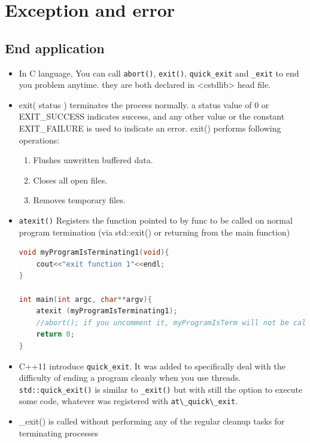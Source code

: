 \documentclass[a4paper,11pt,twoside]{book}
\begin{document}
\chapter{Exception and error}

\section{End application}
\begin{itemize}
	\item In C language, You can call \texttt{abort()}, \texttt{exit()}, \texttt{quick\_exit} and  \texttt{\_exit} to end you problem anytime. they are both declared in <cstdlib> head file.
	
	\item exit( status ) terminates the process normally.
	a status value of 0 or EXIT\_SUCCESS indicates success, and any other value or the constant EXIT\_FAILURE is used to indicate an error. exit() performs following operations:
	\begin{enumerate}
		\item Flushes unwritten buffered data.
		\item Closes all open files.
		\item Removes temporary files.
	\end{enumerate}
	
	\item \texttt{atexit()} Registers the function pointed to by func to be called on normal program termination (via std::exit() or returning from the main function)
\begin{lstlisting}[frame=single, language=c++]
void myProgramIsTerminating1(void){
	cout<<"exit function 1"<<endl;
}
	
int main(int argc, char**argv){
	atexit (myProgramIsTerminating1);
	//abort(); if you uncomment it, myProgramIsTerm will not be called.
	return 0;
}
\end{lstlisting}
	
	\item C++11 introduce \texttt{quick\_exit}. It was added to specifically deal with the difficulty of ending a program cleanly when you use threads. \texttt{std::quick\_exit()} is similar to \texttt{\_exit()} but with still the option to execute some code, whatever was registered with \verb=at\_quick\_exit=.
	
	\item \_exit() is called without performing any of the regular cleanup tasks for terminating processes
	

\end{itemize}
\end{document}
